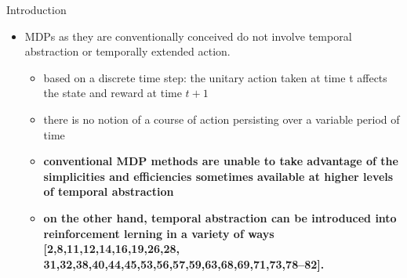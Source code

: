 \begin{frame}{Introduction}
    \begin{itemize}
        \item MDPs as they are conventionally conceived do not involve temporal abstraction or temporally extended action.
        \begin{itemize}
            \item based on a discrete time step: the unitary action taken at time t affects the state and reward at time $t + 1$
            \item there is no notion of a course of action persisting over a variable period of time
            \pause
            \item \textbf{conventional MDP methods are unable to take advantage of the simplicities and efficiencies sometimes available at higher levels of temporal abstraction}
            \item \textbf{\color{red} on the other hand, temporal abstraction can be introduced into reinforcement lerning in a variety of ways [2,8,11,12,14,16,19,26,28, 31,32,38,40,44,45,53,56,57,59,63,68,69,71,73,78–82].}

\end{itemize}
\end{itemize}
\end{frame}
